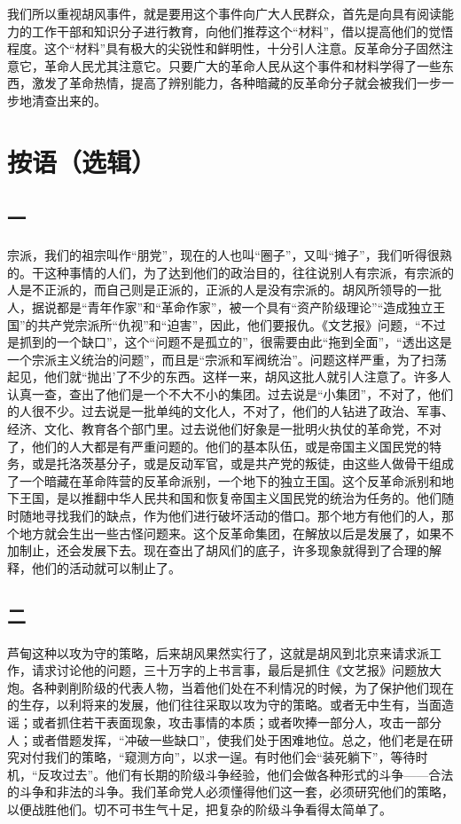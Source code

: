 我们所以重视胡风事件，就是要用这个事件向广大人民群众，首先是向具有阅读能力的工作干部和知识分子进行教育，向他们推荐这个“材料”，借以提高他们的觉悟程度。这个“材料”具有极大的尖锐性和鲜明性，十分引人注意。反革命分子固然注意它，革命人民尤其注意它。只要广大的革命人民从这个事件和材料学得了一些东西，激发了革命热情，提高了辨别能力，各种暗藏的反革命分子就会被我们一步一步地清查出来的。

\date{一九五五年五月、六月}
\section{按语（选辑）}

\subsection*{一}

宗派，我们的祖宗叫作“朋党”，现在的人也叫“圈子”，又叫“摊子”，我们听得很熟的。干这种事情的人们，为了达到他们的政治目的，往往说别人有宗派，有宗派的人是不正派的，而自己则是正派的，正派的人是没有宗派的。胡风所领导的一批人，据说都是“青年作家”和“革命作家”，被一个具有“资产阶级理论”“造成独立王国”的共产党宗派所“仇视”和“迫害”，因此，他们要报仇。《文艺报》问题，“不过是抓到的一个缺口”，这个“问题不是孤立的”，很需要由此“拖到全面”，“透出这是一个宗派主义统治的问题”，而且是“宗派和军阀统治”。问题这样严重，为了扫荡起见，他们就“抛出’了不少的东西。这样一来，胡风这批人就引人注意了。许多人认真一查，查出了他们是一个不大不小的集团。过去说是“小集团”，不对了，他们的人很不少。过去说是一批单纯的文化人，不对了，他们的人钻进了政治、军事、经济、文化、教育各个部门里。过去说他们好象是一批明火执仗的革命党，不对了，他们的人大都是有严重问题的。他们的基本队伍，或是帝国主义国民党的特务，或是托洛茨基分子，或是反动军官，或是共产党的叛徒，由这些人做骨干组成了一个暗藏在革命阵营的反革命派别，一个地下的独立王国。这个反革命派别和地下王国，是以推翻中华人民共和国和恢复帝国主义国民党的统治为任务的。他们随时随地寻找我们的缺点，作为他们进行破坏活动的借口。那个地方有他们的人，那个地方就会生出一些古怪问题来。这个反革命集团，在解放以后是发展了，如果不加制止，还会发展下去。现在查出了胡风们的底子，许多现象就得到了合理的解释，他们的活动就可以制止了。

\subsection*{二}

芦甸这种以攻为守的策略，后来胡风果然实行了，这就是胡风到北京来请求派工作，请求讨论他的问题，三十万字的上书言事，最后是抓住《文艺报》问题放大炮。各种剥削阶级的代表人物，当着他们处在不利情况的时候，为了保护他们现在的生存，以利将来的发展，他们往往采取以攻为守的策略。或者无中生有，当面造谣；或者抓住若干表面现象，攻击事情的本质；或者吹捧一部分人，攻击一部分人；或者借题发挥，“冲破一些缺口”，使我们处于困难地位。总之，他们老是在研究对付我们的策略，“窥测方向”，以求一逞。有时他们会“装死躺下”，等待时机，“反攻过去”。他们有长期的阶级斗争经验，他们会做各种形式的斗争——合法的斗争和非法的斗争。我们革命党人必须懂得他们这一套，必须研究他们的策略，以便战胜他们。切不可书生气十足，把复杂的阶级斗争看得太简单了。

